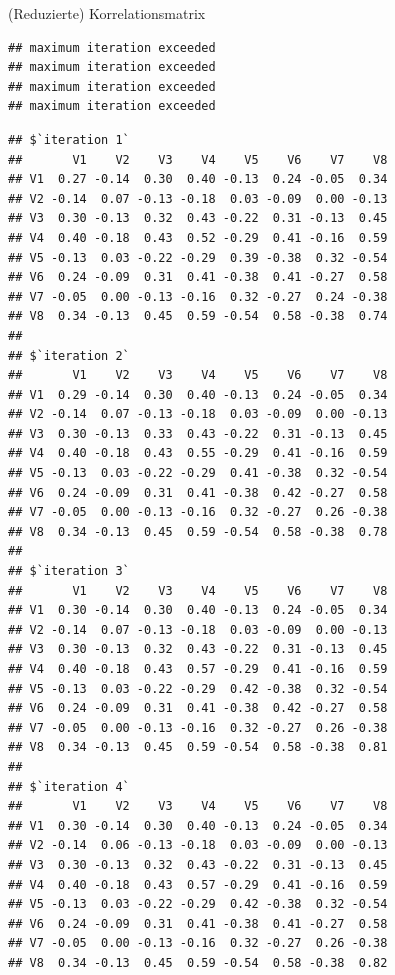 \documentclass[
  ignorenonframetext,
]{beamer}
\begin{document}
\begin{frame}[fragile]{(Reduzierte) Korrelationsmatrix}
\protect\hypertarget{reduzierte-korrelationsmatrix}{}
\begin{verbatim}
## maximum iteration exceeded
## maximum iteration exceeded
## maximum iteration exceeded
## maximum iteration exceeded
\end{verbatim}

\begin{verbatim}
## $`iteration 1`
##       V1    V2    V3    V4    V5    V6    V7    V8
## V1  0.27 -0.14  0.30  0.40 -0.13  0.24 -0.05  0.34
## V2 -0.14  0.07 -0.13 -0.18  0.03 -0.09  0.00 -0.13
## V3  0.30 -0.13  0.32  0.43 -0.22  0.31 -0.13  0.45
## V4  0.40 -0.18  0.43  0.52 -0.29  0.41 -0.16  0.59
## V5 -0.13  0.03 -0.22 -0.29  0.39 -0.38  0.32 -0.54
## V6  0.24 -0.09  0.31  0.41 -0.38  0.41 -0.27  0.58
## V7 -0.05  0.00 -0.13 -0.16  0.32 -0.27  0.24 -0.38
## V8  0.34 -0.13  0.45  0.59 -0.54  0.58 -0.38  0.74
## 
## $`iteration 2`
##       V1    V2    V3    V4    V5    V6    V7    V8
## V1  0.29 -0.14  0.30  0.40 -0.13  0.24 -0.05  0.34
## V2 -0.14  0.07 -0.13 -0.18  0.03 -0.09  0.00 -0.13
## V3  0.30 -0.13  0.33  0.43 -0.22  0.31 -0.13  0.45
## V4  0.40 -0.18  0.43  0.55 -0.29  0.41 -0.16  0.59
## V5 -0.13  0.03 -0.22 -0.29  0.41 -0.38  0.32 -0.54
## V6  0.24 -0.09  0.31  0.41 -0.38  0.42 -0.27  0.58
## V7 -0.05  0.00 -0.13 -0.16  0.32 -0.27  0.26 -0.38
## V8  0.34 -0.13  0.45  0.59 -0.54  0.58 -0.38  0.78
## 
## $`iteration 3`
##       V1    V2    V3    V4    V5    V6    V7    V8
## V1  0.30 -0.14  0.30  0.40 -0.13  0.24 -0.05  0.34
## V2 -0.14  0.07 -0.13 -0.18  0.03 -0.09  0.00 -0.13
## V3  0.30 -0.13  0.32  0.43 -0.22  0.31 -0.13  0.45
## V4  0.40 -0.18  0.43  0.57 -0.29  0.41 -0.16  0.59
## V5 -0.13  0.03 -0.22 -0.29  0.42 -0.38  0.32 -0.54
## V6  0.24 -0.09  0.31  0.41 -0.38  0.42 -0.27  0.58
## V7 -0.05  0.00 -0.13 -0.16  0.32 -0.27  0.26 -0.38
## V8  0.34 -0.13  0.45  0.59 -0.54  0.58 -0.38  0.81
## 
## $`iteration 4`
##       V1    V2    V3    V4    V5    V6    V7    V8
## V1  0.30 -0.14  0.30  0.40 -0.13  0.24 -0.05  0.34
## V2 -0.14  0.06 -0.13 -0.18  0.03 -0.09  0.00 -0.13
## V3  0.30 -0.13  0.32  0.43 -0.22  0.31 -0.13  0.45
## V4  0.40 -0.18  0.43  0.57 -0.29  0.41 -0.16  0.59
## V5 -0.13  0.03 -0.22 -0.29  0.42 -0.38  0.32 -0.54
## V6  0.24 -0.09  0.31  0.41 -0.38  0.41 -0.27  0.58
## V7 -0.05  0.00 -0.13 -0.16  0.32 -0.27  0.26 -0.38
## V8  0.34 -0.13  0.45  0.59 -0.54  0.58 -0.38  0.82
\end{verbatim}
\end{frame}
\end{document}
